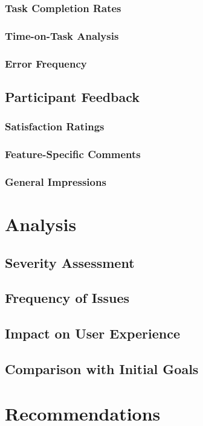 \documentclass{article}
\begin{document}
\subsubsection{Task Completion Rates}
\subsubsection{Time-on-Task Analysis}
\subsubsection{Error Frequency}

\subsection{Participant Feedback}
\subsubsection{Satisfaction Ratings}
\subsubsection{Feature-Specific Comments}
\subsubsection{General Impressions}

\newpage
\section{Analysis}
\subsection{Severity Assessment}
\subsection{Frequency of Issues}
\subsection{Impact on User Experience}
\subsection{Comparison with Initial Goals}

\newpage
\section{Recommendations}
\end{document}
